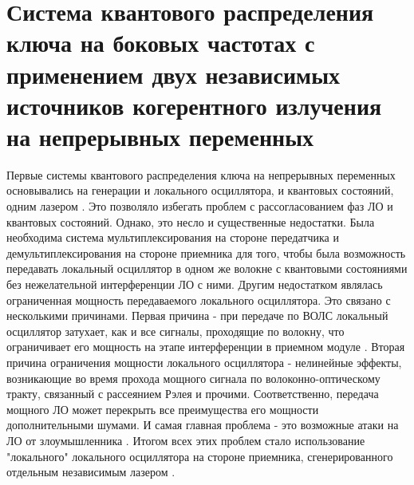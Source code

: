 \chapter{Система квантового распределения ключа на боковых частотах с применением двух независимых источников когерентного излучения на непрерывных переменных}\label{ch:ch3}
\renewcommand{\thefigure}{3.\arabic{figure}} %
\setcounter{figure}{0}                     %

Первые системы квантового распределения ключа на непрерывных переменных основывались на генерации и локального осциллятора, и квантовых состояний, одним лазером \cite{diamanti2015}. Это позволяло избегать проблем с рассогласованием фаз ЛО и квантовых состояний. Однако, это несло и существенные недостатки. Была необходима система мультиплексирования на стороне передатчика и демультиплексирования на стороне приемника для того, чтобы была возможность передавать локальный осциллятор в одном же волокне с квантовыми состояниями без нежелательной интерференции ЛО с ними. Другим недостатком являлась ограниченная мощность передаваемого локального осциллятора. Это связано с несколькими причинами. Первая причина - при передаче по ВОЛС локальный осциллятор затухает, как и все сигналы, проходящие по волокну, что ограничивает его мощность на этапе интерференции в приемном модуле \cite{tang2020}. Вторая причина ограничения мощности локального осциллятора - нелинейные эффекты, возникающие во время прохода мощного сигнала по волоконно-оптическому тракту, связанный с рассеянием Рэлея и прочими. Соответственно, передача мощного ЛО может перекрыть все преимущества его мощности дополнительными шумами. И самая главная проблема - это возможные атаки на ЛО от злоумышленника \cite{jouguet2013}. Итогом всех этих проблем стало использование "локального" локального осциллятора на стороне приемника, сгенерированного отдельным независимым лазером \cite{khaksar2023, adan2024, laudenbach2019a, wang2018b}.
